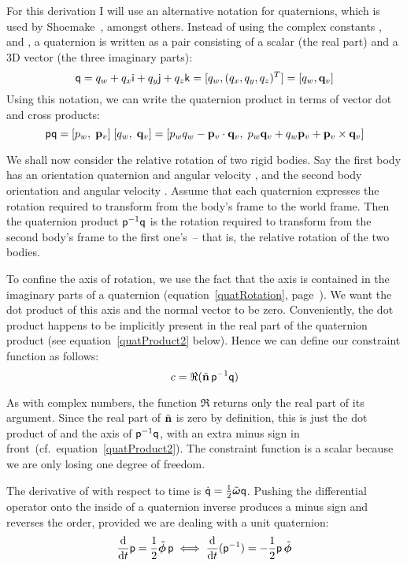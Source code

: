 For this derivation I will use an alternative notation for quaternions, which is used by
Shoemake~\cite{Shoemake:85}, amongst others. Instead of using the complex constants \qi{}, \qj{}
and \qk{}, a quaternion is written as a pair consisting of a scalar (the real part) and a 3D
vector (the three imaginary parts):
\begin{equation}
\q{q} = q_w + q_x\qi + q_y\qj + q_z\qk = [q_w, (q_x, q_y, q_z)^T] = [q_w, \ve{q}_v]
\end{equation}
Using this notation, we can write the quaternion product in terms of vector dot and cross products:
\begin{equation}\label{quatProduct2}
\q{p}\q{q} = [p_w,\; \ve{p}_v]\;[q_w,\; \ve{q}_v] =
    [p_w q_w - \ve{p}_v \cdot \ve{q}_v,\;
    p_w \ve{q}_v + q_w \ve{p}_v + \ve{p}_v \times \ve{q}_v]
\end{equation}

We shall now consider the relative rotation of two rigid bodies. Say the first body has an
orientation quaternion  and angular velocity \ve{\phi}, and the second body orientation
 and angular velocity \ve{\omega}. Assume that each quaternion expresses the rotation
required to transform from the body's frame to the world frame. Then the quaternion product
$\mathsf{p}^{-1}\mathsf{q}$ is the rotation required to transform from the second body's frame to the first
one's~-- that is, the relative rotation of the two bodies.

To confine the axis of rotation, we use the fact that the axis is contained in the imaginary
parts of a quaternion (equation~\ref{quatRotation}, page~\pageref{quatRotation}). We want the dot
product of this axis and the normal vector  to be zero. Conveniently, the dot product
happens to be implicitly present in the real part of the quaternion product
(see equation~\ref{quatProduct2} below). Hence we can define our constraint
function as follows:
\begin{equation}\label{rotConstrEqn}
c = \Re(\tilde{\ve{n}}\, \q{p}^{-1}\q{q})
\end{equation}

As with complex numbers, the function $\Re$ returns only the real part of its argument.
Since the real part of $\tilde{\ve{n}}$ is zero by definition, this is just the dot product of
 and the axis of $\mathsf{p}^{-1}\mathsf{q}$, with an extra minus sign in
front~(cf.\ equation~\ref{quatProduct2}). The constraint function is a scalar because
we are only losing one degree of freedom.

The derivative of  with respect to time is
$\dot{\q{q}} = \frac{1}{2}\tilde{\ve{\omega}}\q{q}$. Pushing the differential operator
onto the inside of a quaternion inverse produces a minus sign and reverses the order, provided
we are dealing with a unit quaternion:
\begin{equation}
\frac{\diff}{\diff t} \q{p} = \frac{1}{2}\tilde{\ve{\phi}}\,\q{p} \iff
    \frac{\diff}{\diff t} (\q{p}^{-1}) = -\frac{1}{2}\q{p}\,\tilde{\ve{\phi}}
\end{equation}

